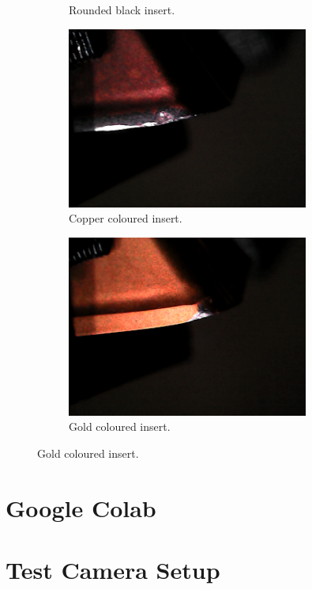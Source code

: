 \begin{figure}[hbtp]
\begin{subfigure}{0.49\textwidth}
		\caption{Rounded black insert.}
	\end{subfigure}
	\hspace*{\fill}
	\begin{subfigure}{0.49\textwidth}
		\includegraphics[width=3.125000in, keepaspectratio=true]{./fig/Vision/Dataset/automated_datasets/2_created_datasets/2_Spaghetti_dataset/rounded_copper_b_014_p_005_l_006-011_white_nb.png}
		\caption{Copper coloured insert.}
	\end{subfigure}
	\hspace*{\fill}
	\begin{subfigure}{0.49\textwidth}
		\includegraphics[width=3.125000in, keepaspectratio=true]{./fig/Vision/Dataset/automated_datasets/2_created_datasets/2_Spaghetti_dataset/rounded_gold_b_015_p_006_l_006-011_white_nb.png}
		\caption{Gold coloured insert.}
	\end{subfigure}
\end{figure}



\section{Google Colab}
\section{Test Camera Setup}

